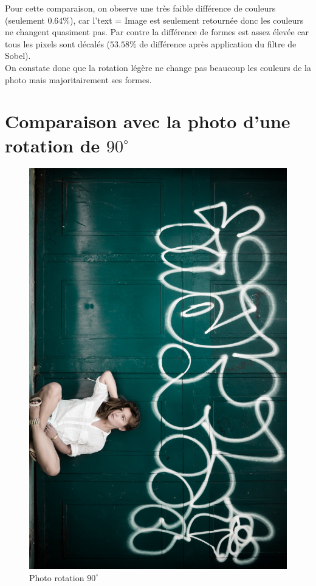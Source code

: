 \documentclass[]{article}
\begin{document}
Pour cette comparaison, on observe une très faible différence de
couleurs (seulement $0.64 \%$), car l'text = Image est seulement retournée donc
les couleurs ne changent quasiment pas. Par contre la différence de
formes est assez élevée car tous les pixels sont décalés ($53.58 \%$ de
différence après application du filtre de Sobel).\\On constate donc que
la rotation légère ne change pas beaucoup les couleurs de la photo mais
majoritairement ses formes.

\newpage

\section{Comparaison avec la photo d'une rotation de
$90^{\circ}$}\label{comparaison-avec-la-photo-dune-rotation-de-90circ}

\begin{figure}[htbp]
\centering
\includegraphics[scale=0.47]{photos/rotation.jpg}
\caption{Photo rotation $90^{\circ}$}
\end{figure}
\end{document}
